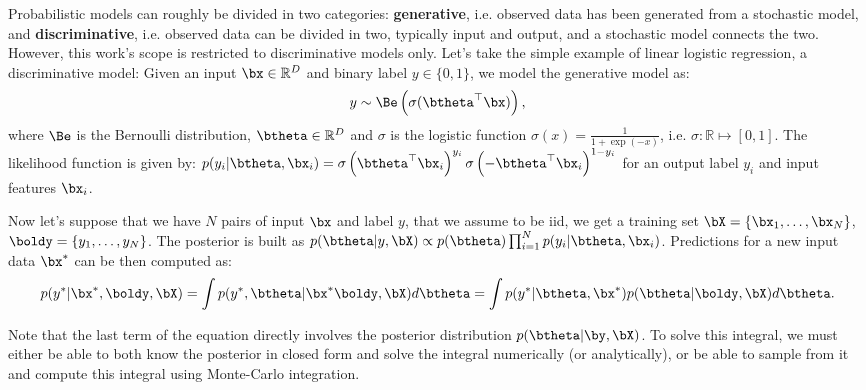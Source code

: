 Probabilistic models can roughly be divided in two categories: \textbf{generative}, i.e. observed data has been generated from a stochastic model, and \textbf{discriminative}, i.e. observed data can be divided in two, typically input and output, and a stochastic model connects the two.
However, this work's scope is restricted to discriminative models only.
Let's take the simple example of linear logistic regression, a discriminative model:
Given an input $\bx \in \mathbb{R}^D$ and binary label $y\in \{ 0, 1\}$, we model the generative model as:
\begin{align}
    y \sim \Be\left(\sigma(\btheta^\top \bx)\right),
\end{align}
where $\Be$ is the Bernoulli distribution, $\btheta\in\mathbb{R}^D$ and $\sigma$ is the logistic function $\sigma(x) = \frac{1}{1 + \exp(-x)}$, i.e. $\sigma : \mathbb{R} \mapsto [0, 1]$.
The likelihood function is given by: $p(y_i|\btheta,\bx_i) =\sigma\left(\btheta^\top \bx_i\right)^{y_i}\sigma\left(-\btheta^\top \bx_i\right)^{1-y_i}$ for an output label $y_i$ and input features $\bx_i$.

Now let's suppose that we have $N$ pairs of input $\bx$ and label $y$, that we assume to be \ac{iid}, we get a training set $\bX = \{\bx_1,\ldots,\bx_N\}$, $\boldy = \{y_1,\ldots,y_N\}$.
The posterior is built as $p(\btheta|y,\bX) \propto p(\btheta)\prod_{i=1}^N p(y_i|\btheta, \bx_i)$.
Predictions for a new input data $\bx^*$ can be then computed as:
\begin{align}
p(y^*|\bx^*,\boldy,\bX) = \int p(y^*, \btheta|\bx^*\boldy, \bX)d\btheta = \int p(y^*|\btheta,\bx^*) p(\btheta|\boldy,\bX)d\btheta.
\end{align}

Note that the last term of the equation directly involves the posterior distribution $p(\btheta|\by,\bX)$.
To solve this integral, we must either be able to both know the posterior in closed form and solve the integral numerically (or analytically), or be able to sample from it and compute this integral using Monte-Carlo integration.

